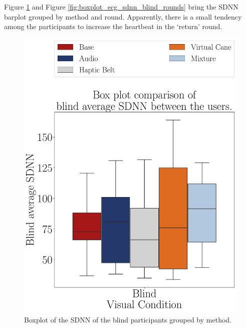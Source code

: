 %
%

Figure \ref{fig:boxplot_ecg_sdnn_blind_scene} and Figure \ref{fig:boxplot_ecg_sdnn_blind_rounds} bring the SDNN barplot grouped by method and round. Apparently, there is a small tendency among the participants to increase the heartbeat in the ‘return’ round.

\begin{figure}[!htb]
    \centering
    \begin{minipage}{0.45\textwidth}
        \centering
        \includegraphics[width = \textwidth]{Resultados/ECG/Figuras/pdf/boxplot_ecg_sdnn_blind_scene.pdf}
        \caption{Boxplot of the SDNN of the blind participants grouped by method.}
        \label{fig:boxplot_ecg_sdnn_blind_scene}
    \end{minipage}

\end{figure}
